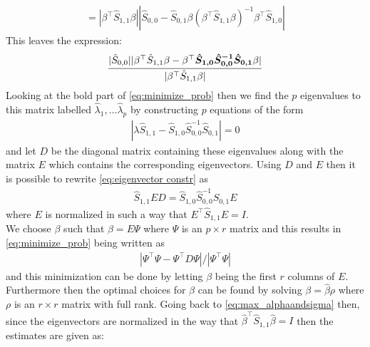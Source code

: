 \begin{bevis}
\begin{align*}
         =|\beta^{\top} \hat{S}_{1,1}\beta||\hat{S}_{0,0}-\hat{S}_{0,1}\beta(\beta^{\top} \hat{S}_{1,1}\beta)^{-1}\beta^{\top}\hat{S}_{1,0}|
 \end{align*}
 This leaves the expression:
 \begin{align}\label{eq:minimize_prob}
     \frac{|\hat{S}_{0,0}||\beta^{\top}\hat{S}_{1,1}\beta-\beta^{\top}\boldsymbol{\hat{S}_{1,0}\hat{S}^{-1}_{0,0}\hat{S}_{0,1}}\beta|}
     {|\beta^{\top} \hat{S}_{1,1}\beta|}
 \end{align}
 Looking at the bold part of \eqref{eq:minimize_prob} then we find the $p$ eigenvalues to this matrix labelled $\hat{\lambda}_1,\ldots\hat{\lambda}_p$ by constructing $p$ equations of the form
 \begin{align}\label{eq:eigenvector constr}
     |\lambda \hat{S}_{1,1}-\hat{S}_{1,0}\hat{S}^{-1}_{0,0}\hat{S}_{0,1}|=0
 \end{align}
and let $D$ be the diagonal matrix containing these eigenvalues along with the matrix $E$ which contains the corresponding eigenvectors. Using $D$ and $E$ then it is possible to rewrite \eqref{eq:eigenvector constr} as
\begin{align*}
\hat{S}_{1,1}ED=\hat{S}_{1,0}\hat{S}^{-1}_{0,0}\hat{S}_{0,1}E
\end{align*}
where $E$ is normalized in such a way that $E^\top\hat{S}_{1,1}E=I$.\\
We choose $\beta$ such that $\beta=E\Psi$ where $\Psi$ is an $p\times r$ matrix and this results in \eqref{eq:minimize_prob} being written as
\begin{align*}
    |\Psi^\top\Psi-\Psi^\top D\Psi|/|\Psi^\top\Psi|
\end{align*}
and this minimization can be done by letting $\beta$ being the first $r$ columns of $E$. Furthermore then the optimal choices for $\beta$ can be found by solving $\beta=\hat{\beta}\rho$ where $\rho$ is an $r\times r$ matrix with full rank.
Going back to \eqref{eq:max_alphaandsigma} then, since the eigenvectors are normalized in the way that $\hat{\beta}^\top \hat{S}_{1,1}\hat{\beta}=I$ then the estimates are given as:


\end{bevis}
